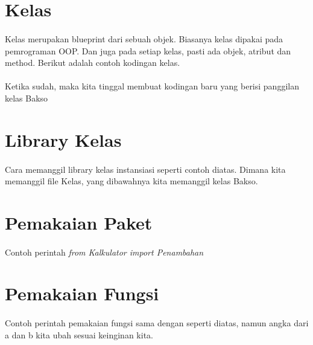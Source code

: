 \documentclass{article}
\begin{document}
\section{Kelas}
\paragraph{}
Kelas merupakan blueprint dari sebuah objek. Biasanya kelas dipakai pada pemrograman OOP. Dan juga pada setiap kelas, pasti ada objek, atribut dan method. Berikut adalah contoh kodingan kelas.

\paragraph{}
Ketika sudah, maka kita tinggal membuat kodingan baru yang berisi panggilan kelas Bakso


\section{Library Kelas}
\paragraph{}
Cara memanggil library kelas instansiasi seperti contoh diatas. Dimana kita memanggil file Kelas, yang dibawahnya kita memanggil kelas Bakso.


\section{Pemakaian Paket}
\paragraph{}
Contoh perintah \textit{from Kalkulator import Penambahan}


\newpage
\section{Pemakaian Fungsi}
\paragraph{}
Contoh perintah pemakaian fungsi sama dengan seperti diatas, namun angka dari a dan b kita ubah sesuai keinginan kita.

\end{document}
